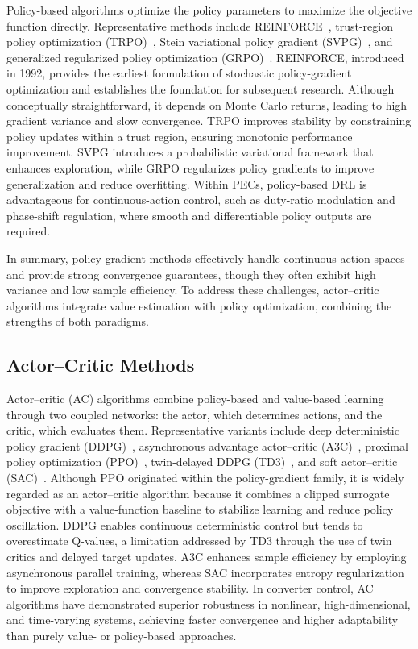 Policy-based algorithms optimize the policy parameters to maximize the objective function directly. 
Representative methods include REINFORCE~\cite{williams1992simple}, trust-region policy optimization (TRPO)~\cite{schulman2015trust}, Stein variational policy gradient (SVPG)~\cite{liu2017stein}, and generalized regularized policy optimization (GRPO)~\cite{shao2024deepseekmath}. 
REINFORCE, introduced in 1992, provides the earliest formulation of stochastic policy-gradient optimization and establishes the foundation for subsequent research. 
Although conceptually straightforward, it depends on Monte Carlo returns, leading to high gradient variance and slow convergence. 
TRPO improves stability by constraining policy updates within a trust region, ensuring monotonic performance improvement. 
SVPG introduces a probabilistic variational framework that enhances exploration, while GRPO regularizes policy gradients to improve generalization and reduce overfitting. 
Within PECs, policy-based DRL is advantageous for continuous-action control, such as duty-ratio modulation and phase-shift regulation, where smooth and differentiable policy outputs are required.

In summary, policy-gradient methods effectively handle continuous action spaces and provide strong convergence guarantees, though they often exhibit high variance and low sample efficiency. 
To address these challenges, actor–critic algorithms integrate value estimation with policy optimization, combining the strengths of both paradigms.

\subsection{Actor–Critic Methods}
\label{sec:ac_methods}

Actor–critic (AC) algorithms combine policy-based and value-based learning through two coupled networks: the actor, which determines actions, and the critic, which evaluates them. 
Representative variants include deep deterministic policy gradient (DDPG)~\cite{lillicrap2015continuous}, asynchronous advantage actor–critic (A3C)~\cite{mnih2016asynchronous}, proximal policy optimization (PPO)~\cite{schulman2017proximal}, twin-delayed DDPG (TD3)~\cite{fujimoto2018addressing}, and soft actor–critic (SAC)~\cite{haarnoja2018soft}. 
Although PPO originated within the policy-gradient family, it is widely regarded as an actor–critic algorithm because it combines a clipped surrogate objective with a value-function baseline to stabilize learning and reduce policy oscillation. 
DDPG enables continuous deterministic control but tends to overestimate Q-values, a limitation addressed by TD3 through the use of twin critics and delayed target updates. 
A3C enhances sample efficiency by employing asynchronous parallel training, whereas SAC incorporates entropy regularization to improve exploration and convergence stability. 
In converter control, AC algorithms have demonstrated superior robustness in nonlinear, high-dimensional, and time-varying systems, achieving faster convergence and higher adaptability than purely value- or policy-based approaches.

